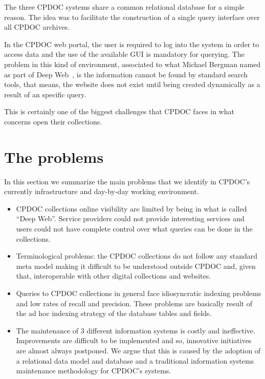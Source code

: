 \documentclass{llncs}
\begin{document}
The three CPDOC systems share a common relational database for a
simple reason. The idea was to facilitate the construction of a single
query interface over all CPDOC archives.

In the CPDOC web portal, the user is required to log into the system
in order to access data and the use of the available GUI is mandatory
for querying. The problem in this kind of environment, associated to
what Michael Bergman named as part of Deep
Web~\cite{bergman2001white}, is the information cannot be found by
standard search tools, that means, the website does not exist until
being created dynamically as a result of an specific query.

This is certainly one of the biggest challenges that CPDOC faces in
what concerns open their collections.


\section{The problems}

In this section we summarize the main problems that we identify in
CPDOC's currently infrastructure and day-by-day working environment.

\begin{itemize}
\item CPDOC collections online visibility are limited by being in what
  is called ``Deep Web''. Service providers could not provide
  interesting services and users could not have complete control over
  what queries can be done in the collections.

\item Terminological problems: the CPDOC collections do not follow any
  standard meta model making it difficult to be understood outside
  CPDOC and, given that, interoperable with other digital collections
  and websites.

\item Queries to CPDOC collections in general face idiosyncratic
  indexing problems and low rates of recall and precision. These
  problems are basically result of the ad hoc indexing strategy of the
  database tables and fields.

\item The maintenance of 3 different information systems is costly and
  ineffective. Improvements are difficult to be implemented and so,
  innovative initiatives are almost always postponed. We argue that
  this is caused by the adoption of a relational data model and
  database and a traditional information systems maintenance
  methodology for CPDOC's systems.
\end{itemize}
\end{document}
